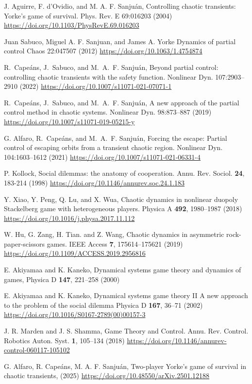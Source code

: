 \begin{thebibliography}{04}





J. Aguirre, F. d’Ovidio, and M. A. F. Sanjuán,
Controlling chaotic transients: Yorke’s game of survival.
Phys. Rev. E 69:016203
(2004)
\url{https://doi.org/10.1103/PhysRevE.69.016203}



Juan Sabuco, Miguel A. F. Sanjuan, and James A. Yorke
Dynamics of partial control
Chaos 22:047507
(2012)
\url{https://doi.org/10.1063/1.4754874}


R.~Cape{\'a}ns, J.~Sabuco, and M.~A.~F. Sanju{\'a}n, 
Beyond partial control: controlling chaotic transients
with the safety function.
Nonlinear Dyn. 107:2903–2910
(2022)
\url{https://doi.org/10.1007/s11071-021-07071-1}

R.~Cape{\'a}ns, J.~Sabuco, and M.~A.~F. Sanju{\'a}n, 
A new approach of the partial control method in chaotic systems.
Nonlinear Dyn. 98:873--887
(2019)
\url{https://doi.org/10.1007/s11071-019-05215-y}

G. Alfaro, R.~Cape{\'a}ns, and M.~A.~F. Sanju{\'a}n, 
Forcing the escape: Partial control of escaping orbits from a
transient chaotic region.
Nonlinear Dyn. 104:1603–1612
(2021) 
\url{https://doi.org/10.1007/s11071-021-06331-4}





P. Kollock,
Social dilemmas: the anatomy of cooperation.
Annu. Rev. Sociol. \textbf{24}, 183-214
(1998)
\url{https://doi.org/10.1146/annurev.soc.24.1.183}

Y. Xiao, Y. Peng, Q. Lu, and X. Wua,
Chaotic dynamics in nonlinear duopoly Stackelberg game
with heterogeneous players.
Physica A \textbf{492}, 1980--1987
(2018)
\url{https://doi.org/10.1016/j.physa.2017.11.112}

W. Hu, G. Zang, H. Tian. and Z. Wang,
Chaotic dynamics in asymmetric rock-paper-scissors games.
IEEE Access \textbf{7}, 175614--175621
(2019)
\url{https://doi.org/10.1109/ACCESS.2019.2956816}

E. Akiyamaa and K. Kaneko,
Dynamical systems game theory and dynamics of games,
Physica D \textbf{147}, 221--258
(2000)
\url{}

E. Akiyamaa and K. Kaneko,
Dynamical systems game theory II
A new approach to the problem of the social dilemma
Physica D \textbf{167}, 36--71
(2002)
\url{https://doi.org/10.1016/S0167-2789(00)00157-3}

J. R. Marden and J. S. Shamma,
Game Theory and Control.
Annu. Rev. Control. Robotics Auton. Syst. \textbf{1}, 105--134
(2018)
\url{https://doi.org/10.1146/annurev-control-060117-105102}

G. Alfaro, R. Capeáns, M. A. F. Sanjuán,
Two-player Yorke's game of survival in chaotic transients,
(2025)
\url{https://doi.org/10.48550/arXiv.2501.12188}


\end{thebibliography}